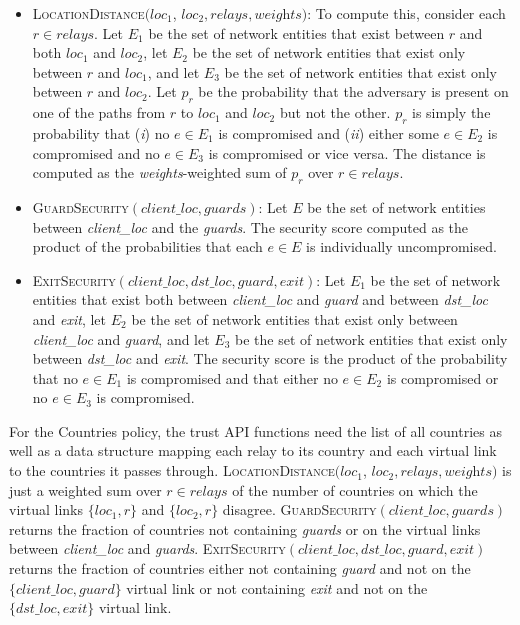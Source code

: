 \documentclass[conference]{styles/IEEEtran}
\newcommand{\compactify}{\settowidth{\labelsep}{o} \settowidth{\labelwidth}{o} \settowidth{\labelindent}{o}}
\begin{document}
\begin{itemize}[\compactify]
\item \textsc{LocationDistance}$(\textit{loc}_1$, $\textit{loc}_2, \textit{relays},
    \textit{weights})$: To compute
    this, consider each $r\in \textit{relays}$. Let $E_1$ be the set of network entities that exist
    between $r$ and both $\textit{loc}_1$ and $\textit{loc}_2$, let $E_2$ be the set of network
    entities that exist only between $r$ and $\textit{loc}_1$, and let $E_3$ be the set of
    network entities that exist only between $r$ and $\textit{loc}_2$. Let $p_r$ be the probability
    that the adversary is present on
    one of the paths from $r$ to $loc_1$ and $loc_2$ but not the other. $p_r$ is simply the
    probability that (\emph{i}) no $e\in E_1$ is compromised and (\emph{ii}) either some $e\in E_2$
    is compromised and no $e\in E_3$ is compromised or vice versa. The distance is computed as the
    \textit{weights}-weighted sum of $p_r$ over $r\in \textit{relays}$.
    
\item \textsc{GuardSecurity}$(\textit{client\_loc}, \textit{guards})$: Let $E$ be the set of network
    entities between \textit{client\_loc} and the \textit{guards}. The security score computed as
    the product of the probabilities that each $e\in E$ is individually uncompromised.
    
\item \textsc{ExitSecurity}$(\textit{client\_loc}, \textit{dst\_loc}, \textit{guard},
    \textit{exit})$: Let $E_1$ be the set of network entities that exist both between
    \textit{client\_loc} and \textit{guard} and between \textit{dst\_loc} and \textit{exit}, let
    $E_2$ be the set of network entities that exist only between \textit{client\_loc} and
    \textit{guard}, and let $E_3$ be the set of network entities that exist only between
    \textit{dst\_loc} and \textit{exit}. The security score is the product of the probability that
    no $e\in E_1$ is compromised and that either no $e\in E_2$ is compromised or no $e\in E_3$ is
    compromised.
\end{itemize}

For the \textsf{Countries} policy, the trust API functions need the list of all countries as well
as a data structure mapping each relay to its country and each virtual link to the countries it
passes through.
\textsc{LocationDistance}$(\textit{loc}_1$, $\textit{loc}_2, \textit{relays}, \textit{weights})$
is just a weighted sum over $r\in \textit{relays}$ of the number of countries on which the virtual
links $\{\textit{loc}_1, r\}$ and $\{\textit{loc}_2, r\}$ disagree.
\textsc{GuardSecurity}$(\textit{client\_loc}, \textit{guards})$ returns the fraction of countries
not containing \textit{guards} or on the virtual links between \textit{client\_loc} and
\textit{guards}.
\textsc{ExitSecurity}$(\textit{client\_loc}, \textit{dst\_loc}, \textit{guard}, \textit{exit})$
returns the fraction of countries either not containing \textit{guard} and not on the
$\{\textit{client\_loc}, guard\}$ virtual link or not containing \textit{exit} and not on the
$\{\textit{dst\_loc}, exit\}$ virtual link.
\end{document}
